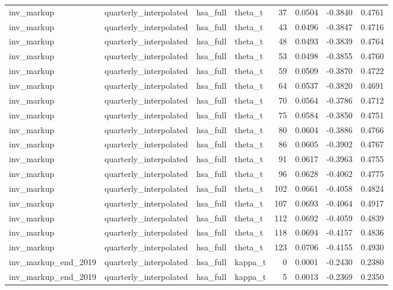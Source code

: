 \begin{tabular}{llllrrrr}
inv\_markup & quarterly\_interpolated & hsa\_full & theta\_t & 37 & 0.0504 & -0.3840 & 0.4761 \\
inv\_markup & quarterly\_interpolated & hsa\_full & theta\_t & 43 & 0.0496 & -0.3847 & 0.4716 \\
inv\_markup & quarterly\_interpolated & hsa\_full & theta\_t & 48 & 0.0493 & -0.3839 & 0.4764 \\
inv\_markup & quarterly\_interpolated & hsa\_full & theta\_t & 53 & 0.0498 & -0.3855 & 0.4760 \\
inv\_markup & quarterly\_interpolated & hsa\_full & theta\_t & 59 & 0.0509 & -0.3870 & 0.4722 \\
inv\_markup & quarterly\_interpolated & hsa\_full & theta\_t & 64 & 0.0537 & -0.3820 & 0.4691 \\
inv\_markup & quarterly\_interpolated & hsa\_full & theta\_t & 70 & 0.0564 & -0.3786 & 0.4712 \\
inv\_markup & quarterly\_interpolated & hsa\_full & theta\_t & 75 & 0.0584 & -0.3850 & 0.4751 \\
inv\_markup & quarterly\_interpolated & hsa\_full & theta\_t & 80 & 0.0604 & -0.3886 & 0.4766 \\
inv\_markup & quarterly\_interpolated & hsa\_full & theta\_t & 86 & 0.0605 & -0.3902 & 0.4767 \\
inv\_markup & quarterly\_interpolated & hsa\_full & theta\_t & 91 & 0.0617 & -0.3963 & 0.4755 \\
inv\_markup & quarterly\_interpolated & hsa\_full & theta\_t & 96 & 0.0628 & -0.4062 & 0.4775 \\
inv\_markup & quarterly\_interpolated & hsa\_full & theta\_t & 102 & 0.0661 & -0.4058 & 0.4824 \\
inv\_markup & quarterly\_interpolated & hsa\_full & theta\_t & 107 & 0.0693 & -0.4064 & 0.4917 \\
inv\_markup & quarterly\_interpolated & hsa\_full & theta\_t & 112 & 0.0692 & -0.4059 & 0.4839 \\
inv\_markup & quarterly\_interpolated & hsa\_full & theta\_t & 118 & 0.0694 & -0.4157 & 0.4836 \\
inv\_markup & quarterly\_interpolated & hsa\_full & theta\_t & 123 & 0.0706 & -0.4155 & 0.4930 \\
inv\_markup\_end\_2019 & quarterly\_interpolated & hsa\_full & kappa\_t & 0 & 0.0001 & -0.2430 & 0.2380 \\
inv\_markup\_end\_2019 & quarterly\_interpolated & hsa\_full & kappa\_t & 5 & 0.0013 & -0.2369 & 0.2350 \\

\end{tabular}
